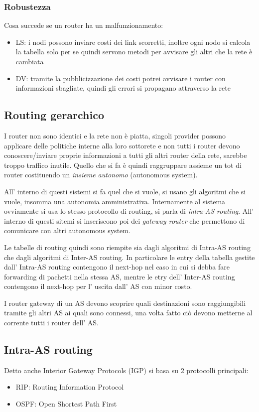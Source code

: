 \subsubsection{Robustezza}
Cosa succede se un router ha un malfunzionamento:
\begin{itemize}
    \item LS: i nodi possono inviare costi dei link scorretti, inoltre ogni nodo si calcola la tabella solo per se quindi servono metodi per avvisare gli altri che la rete è cambiata
    
    \item DV: tramite la pubblicizzazione dei costi potrei avvisare i router con informazioni sbagliate, quindi gli errori si propagano attraverso la rete
\end{itemize}

\subsection{Routing gerarchico}
I router non sono identici e la rete non è piatta, singoli provider possono applicare delle politiche interne alla loro sottorete e non tutti i router devono conoscere/inviare proprie informazioni a tutti gli altri router della rete, sarebbe troppo traffico inutile.
Quello che si fa è quindi raggruppare assieme un tot di router costituendo un \emph{insieme autonomo} (autonomous system).

All' interno di questi sistemi si fa quel che si vuole, si usano gli algoritmi che si vuole, insomma una autonomia amministrativa.
Internamente al sistema ovviamente si usa lo stesso protocollo di routing, si parla di \emph{intra-AS routing}.
All' interno di questi sitemi si inseriscono poi dei \emph{gateway router} che permettono di comunicare con altri autonomous system.

Le tabelle di routing quindi sono riempite sia dagli algoritmi di Intra-AS routing che dagli algoritmi di Inter-AS routing.
In particolare le entry della tabella gestite dall' Intra-AS routing contengono il next-hop nel caso in cui si debba fare forwarding di pachetti nella stessa AS, mentre le etry dell' Inter-AS routing contengono il next-hop per l' uscita dall' AS con minor costo.

I router gateway di un AS devono scoprire quali destinazioni sono raggiungibili tramite gli altri AS ai quali sono connessi, una volta fatto ciò devono metterne al corrente tutti i router dell' AS.

\subsection{Intra-AS routing}
Detto anche Interior Gateway Protocols (IGP) si basa su 2 protocolli principali:
\begin{itemize}
    \item RIP: Routing Information Protocol
    \item OSPF: Open Shortest Path First
\end{itemize}

